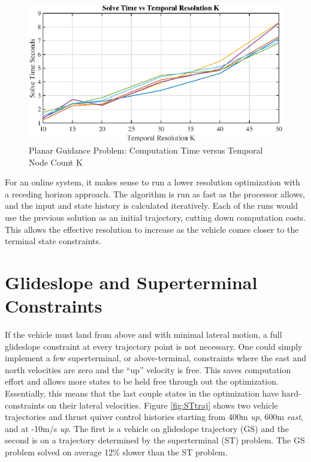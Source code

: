 \begin{figure}[!htbp] 
\label{}
  \centering
  \includegraphics[width=\textwidth]{figs/solvetimevsK.eps}
  \caption{Planar Guidance Problem: Computation Time versus Temporal Node Count K}
  \label{fig:solvetimes}
\end{figure}
For an online system, it makes sense to run a lower resolution optimization with a receding horizon approach. The algorithm is run as fast as the processor allows, and the input and state history is calculated iteratively. Each of the runs would use the previous solution as an initial trajectory, cutting down computation costs. This allows the effective resolution to increase as the vehicle comes closer to the terminal state constraints.



\section{Glideslope and Superterminal Constraints}
If the vehicle must land from above and with minimal lateral motion, a full glideslope constraint at every trajectory point is not necessary. One could simply implement a few superterminal, or above-terminal, constraints where the east and north velocities are zero and the ``up'' velocity is free. This saves computation effort and allows more states to be held free through out the optimization. Essentially, this means that the last couple states in the optimization have hard-constraints on their lateral velocities. Figure \ref{fig:STtraj} shows two vehicle trajectories and thrust quiver control histories starting from 400m \textit{up}, 600m \textit{east}, and at -10m/s \textit{up}. The first is a vehicle on glideslope trajectory (GS) and the second is on a trajectory determined by the superterminal (ST) problem. The GS problem solved on average 12\% slower than the ST problem.


